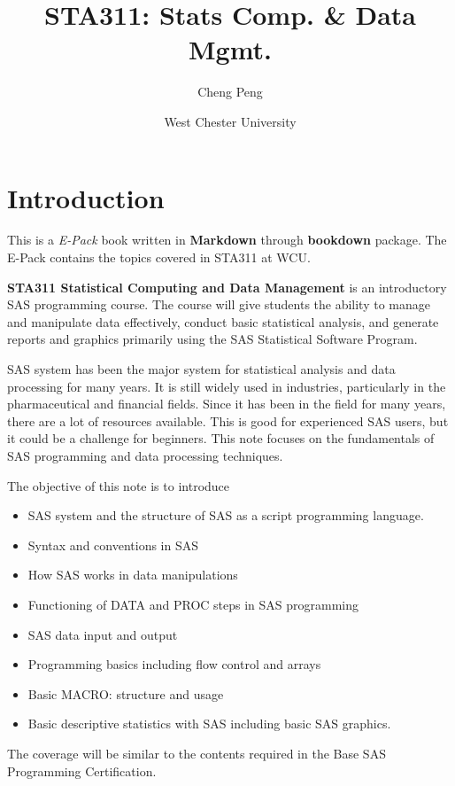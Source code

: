 \documentclass[
]{book}
\title{STA311: Stats Comp. \& Data Mgmt.}
\author{Cheng Peng}
\date{West Chester University}
\begin{document}
\maketitle

{
\setcounter{tocdepth}{1}
\tableofcontents
}
\hypertarget{introduction}{%
\chapter{Introduction}\label{introduction}}

This is a \emph{E-Pack} book written in \textbf{Markdown} through \textbf{bookdown} package. The E-Pack contains the topics covered in STA311 at WCU.

\textbf{STA311 Statistical Computing and Data Management} is an introductory SAS programming course. The course will give students the ability to manage and manipulate data effectively, conduct basic statistical analysis, and generate reports and graphics primarily using the SAS Statistical Software Program.

SAS system has been the major system for statistical analysis and data processing for many years. It is still widely used in industries, particularly in the pharmaceutical and financial fields. Since it has been in the field for many years, there are a lot of resources available. This is good for experienced SAS users, but it could be a challenge for beginners. This note focuses on the fundamentals of SAS programming and data processing techniques.

The objective of this note is to introduce

\begin{itemize}
\item
  SAS system and the structure of SAS as a script programming language.
\item
  Syntax and conventions in SAS
\item
  How SAS works in data manipulations
\item
  Functioning of DATA and PROC steps in SAS programming
\item
  SAS data input and output
\item
  Programming basics including flow control and arrays
\item
  Basic MACRO: structure and usage
\item
  Basic descriptive statistics with SAS including basic SAS graphics.
\end{itemize}

The coverage will be similar to the contents required in the Base SAS Programming Certification.
\end{document}
